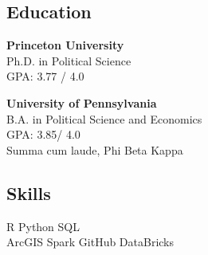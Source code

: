 \documentclass[]{deedy-resume-openfont}
\begin{document}
%
%

%
%

%
%

\begin{minipage}[t]{0.25\textwidth} 
\vspace{0.2cm}
\subsection{Education}
\textbf{Princeton University}\\
Ph.D. in Political Science\\
GPA: 3.77 / 4.0
\sectionsep
    
\textbf{University of Pennsylvania}\\
B.A. in Political Science and Economics\\
GPA: 3.85/ 4.0\\
Summa cum laude, Phi Beta Kappa
\sectionsep
    
    

\subsection{Skills}
R \textbullet{} Python \textbullet{} SQL \textbullet{} \\
ArcGIS \textbullet{} Spark \textbullet{} GitHub \textbullet{} DataBricks \\

\sectionsep


\end{minipage}
\end{document}
